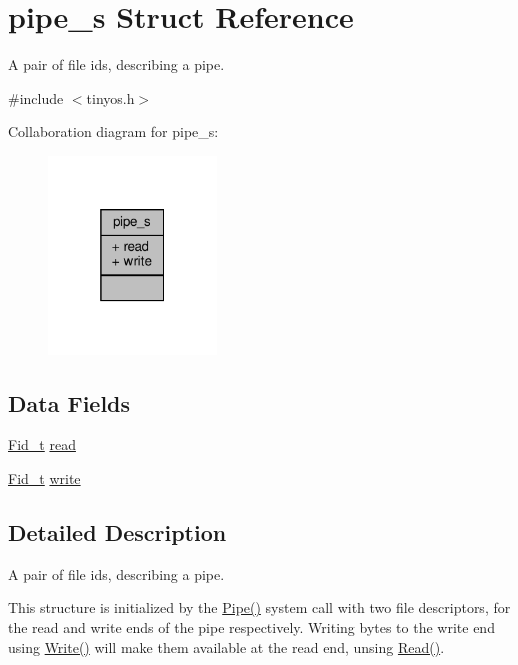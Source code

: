 \hypertarget{structpipe__s}{}\section{pipe\+\_\+s Struct Reference}
\label{structpipe__s}


A pair of file ids, describing a pipe.  




{\ttfamily \#include $<$tinyos.\+h$>$}



Collaboration diagram for pipe\+\_\+s\+:
\nopagebreak
\begin{figure}[H]
\begin{center}
\leavevmode
\includegraphics[width=127pt]{structpipe__s__coll__graph}
\end{center}
\end{figure}
\subsection*{Data Fields}
\begin{DoxyCompactItemize}
\item 
\hyperlink{group__syscalls_ga5097222c5f0da97d92d4712359abc38f}{Fid\+\_\+t} \hyperlink{structpipe__s_ad0839b4f9b1fdb0241411952203f18aa}{read}
\item 
\hyperlink{group__syscalls_ga5097222c5f0da97d92d4712359abc38f}{Fid\+\_\+t} \hyperlink{structpipe__s_a69acc9cdf5f10195c43491e3ffa98cb1}{write}
\end{DoxyCompactItemize}


\subsection{Detailed Description}
A pair of file ids, describing a pipe. 

This structure is initialized by the {\ttfamily \hyperlink{group__syscalls_gab6355ce54e047c31538ed5ed9108b5b3}{Pipe()}} system call with two file descriptors, for the read and write ends of the pipe respectively. Writing bytes to the write end using {\ttfamily \hyperlink{group__syscalls_gaf046f003fde24f79fb395c250137856c}{Write()}} will make them available at the read end, unsing {\ttfamily \hyperlink{group__syscalls_ga3e9dc545a789eb45b2d356eabbac3ee3}{Read()}}. 

